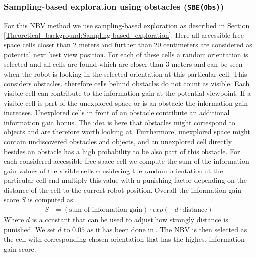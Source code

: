 \documentclass[a4paper,11pt,english]{article}
\begin{document}
\subsubsection{Sampling-based exploration using obstacles (\texttt{SBE(Obs)})}
For this NBV method we use sampling-based exploration as described in Section \ref{Theoretical_background:Sampling-based_exploration}.
Here all accessible free space cells closer than $2$ meters and further than $20$ centimeters are considered as potential next best view position.
For each of these cells a random orientation is selected and all cells are found which are closer than $3$ meters and can be seen when the robot is looking in the selected orientation at this particular cell. This considers obstacles, therefore cells behind obstacles do not count as visible. %
Each visible cell can contribute to the information gain at the potential viewpoint.
If a visible cell is part of the unexplored space or is an obstacle the information gain increases. Unexplored cells in front of an obstacle contribute an additional information gain bonus.
The idea is here that obstacles might correspond to objects and are therefore worth looking at.
Furthermore, unexplored space might contain undiscovered obstacles and objects, and an unexplored cell directly besides an obstacle has a high probability to be also part of this obstacle.
For each considered accessible free space cell we compute the sum of the information gain values of the visible cells considering the random orientation at the particular cell and multiply this value with a punishing factor depending on the distance of the cell to the current robot position.
Overall the information gain score $S$ is computed as:
\begin{align*}
 S &= (\mbox{sum of information gain})\cdot exp(-d\cdot \mbox{distance})
\end{align*}
Where $d$ is a constant that can be used to adjust how strongly distance is punished. We set $d$ to $0.05$ as it has been done in \cite{surmann2003autonomous}.
The NBV is then selected as the cell with corresponding chosen orientation that has the highest information gain score.
\end{document}
